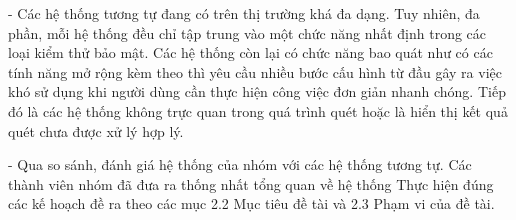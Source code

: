 \tab \tab - Các hệ thống tương tự đang có trên thị trường khá đa dạng.
Tuy nhiên, đa phần, mỗi hệ thống đều chỉ tập trung vào một chức năng nhất định trong các loại kiểm thử bảo mật.
Các hệ thống còn lại có chức năng bao quát như \applicationname có các tính năng mở rộng kèm theo thì yêu cầu nhiều bước cấu hình từ đầu gây ra việc khó sử dụng khi người dùng cần thực hiện công việc đơn giản nhanh chóng.
Tiếp đó là các hệ thống không trực quan trong quá trình quét hoặc là hiển thị kết quả quét chưa được xử lý hợp lý.
\par

- Qua so sánh, đánh giá hệ thống của nhóm với các hệ thống tương tự. 
Các thành viên nhóm đã đưa ra thống nhất tổng quan về hệ thống \applicationname Thực hiện đúng các kế
hoạch đề ra theo các mục 2.2 Mục tiêu đề tài và 2.3 Phạm vi của đề tài.

